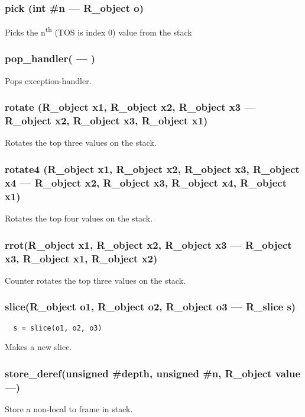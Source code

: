 \subsubsection{pick (int \#n --- R\_object o)}
\vspace{-1em}Picks the n\textsuperscript{th} (TOS is index 0) value from the stack \vspace{-1em}
\subsubsection{pop\_handler( --- )}
\vspace{-1em}Pops exception-handler. \vspace{-1em}
\subsubsection{rotate (R\_object x1, R\_object x2, R\_object x3 --- R\_object x2, R\_object x3, R\_object x1) }
\vspace{-1em}Rotates the top three values on the stack. \vspace{-1em}
\subsubsection{rotate4 (R\_object x1, R\_object x2, R\_object x3, R\_object x4 --- R\_object x2, R\_object x3, R\_object x4, R\_object x1)}
\vspace{-1em}Rotates the top four values on the stack. \vspace{-1em}
\subsubsection{rrot(R\_object x1, R\_object x2, R\_object x3 --- R\_object x3, R\_object x1, R\_object x2)}
\vspace{-1em}Counter rotates the top three values on the stack. \vspace{-1em}
\subsubsection{slice(R\_object o1, R\_object o2, R\_object o3 --- R\_slice s)}
\vspace{-1em}\begin{verbatim}
  s = slice(o1, o2, o3)
\end{verbatim}
\vspace{-1em}Makes a new slice. \vspace{-1em}
\subsubsection{store\_deref(unsigned \#depth, unsigned \#n, R\_object value ---)}
\vspace{-1em}Store a non-local to frame in stack. \vspace{-1em}
